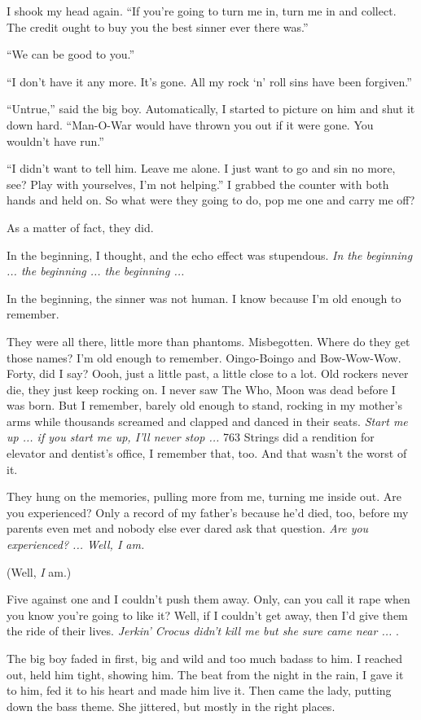 I shook my head again. ``If you're going to turn me in, turn me in and collect. The credit ought to buy you the best sinner ever there was.''

``We can be good to you.''

``I don't have it any more. It's gone. All my rock `n' roll sins have been forgiven.''

``Untrue,'' said the big boy. Automatically, I started to picture on him and shut it down hard. ``Man-O-War would have thrown you out if it were gone. You wouldn't have run.''

``I didn't want to tell him. Leave me alone. I just want to go and sin no more, see? Play with yourselves, I'm not helping.'' I grabbed the counter with both hands and held on. So what were they going to do, pop me one and carry me off?

As a matter of fact, they did.

In the beginning, I thought, and the echo effect was stupendous. \textit{In the beginning ... the beginning ... the beginning ...}

In the beginning, the sinner was not human. I know because I'm old enough to remember.

They were all there, little more than phantoms. Misbegotten. Where do they get those names? I'm old enough to remember. Oingo-Boingo and Bow-Wow-Wow. Forty, did I say? Oooh, just a little past, a little close to a lot. Old rockers never die, they just keep rocking on. I never saw The Who, Moon was dead before I was born. But I remember, barely old enough to stand, rocking in my mother's arms while thousands screamed and clapped and danced in their seats. \textit{Start me up ... if you start me up, I'll never stop ...} 763 Strings did a rendition for elevator and dentist's office, I remember that, too. And that wasn't the worst of it.

They hung on the memories, pulling more from me, turning me inside out. Are you experienced? Only a record of my father's because he'd died, too, before my parents even met and nobody else ever dared ask that question. \textit{Are you experienced? ... Well, I am.}

(Well, \textit{I} am.)

Five against one and I couldn't push them away. Only, can you call it rape when you know you're going to like it? Well, if I couldn't get away, then I'd give them the ride of their lives. \textit{Jerkin' Crocus didn't kill me but she sure came near ...} .

The big boy faded in first, big and wild and too much badass to him. I reached out, held him tight, showing him. The beat from the night in the rain, I gave it to him, fed it to his heart and made him live it. Then came the lady, putting down the bass theme. She jittered, but mostly in the right places.

